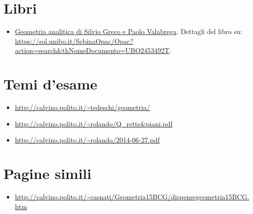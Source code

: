 \documentclass[a4paper,10pt]{article}
\begin{document}
  
  
\section{Libri}
  \begin{itemize}
   \item \href{./libro001.html}{Geometria analitica di Silvio Greco e Paolo Valabrega}. Dettagli del libro su: \url{https://sol.unibo.it/SebinaOpac/Opac?action=search&thNomeDocumento=UBO2453492T}.
  \end{itemize}

\section{Temi d'esame}
  \begin{itemize}
   \item \url{http://calvino.polito.it/~tedeschi/geometria/}
   \item \url{http://calvino.polito.it/~rolando/Q_rette&piani.pdf}
   \item \url{http://calvino.polito.it/~rolando/2014-06-27.pdf}
  \end{itemize}

\section{Pagine simili}
\begin{itemize}
  \item \url{http://calvino.polito.it/~casnati/Geometria15BCG/dispensegeometria15BCG.htm}
\end{itemize}
\end{document}
